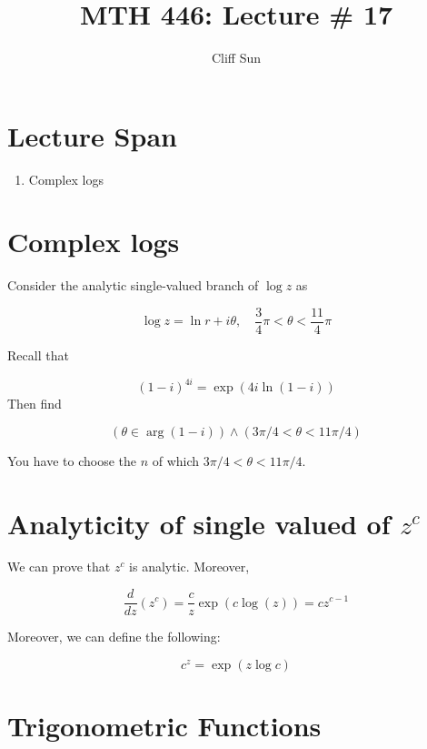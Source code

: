 \documentclass{article}
\title{MTH 446: Lecture \# 17}
\author{Cliff Sun}
\newtheorem{one minute paper}[theorem]{One Minute Paper}
\begin{document}
\maketitle

\section*{Lecture Span}
\begin{enumerate}
    \item Complex logs
\end{enumerate}

\section*{Complex logs}

Consider the analytic single-valued branch of $\log z$ as 

\begin{equation}
    \log z = \ln r + i\theta, \quad \frac{3}{4}\pi < \theta < \frac{11}{4}\pi
\end{equation}

Recall that 

\begin{equation}
    (1-i)^{4i} = \exp(4i\ln(1-i))
\end{equation}
Then find 

\begin{equation}
    \left( \theta \in \arg(1-i) \right) \land (3\pi/4 < \theta < 11\pi/4)
\end{equation}

You have to choose the $n$ of which $3\pi/4 < \theta < 11\pi/4$. 

\section*{Analyticity of single valued of $z^c$}

We can prove that $z^c$ is analytic. Moreover, 

\begin{equation}
    \frac{d}{dz}(z^c) = \frac{c}{z}\exp(c\log(z)) = cz^{c-1}
\end{equation}

Moreover, we can define the following:

\begin{equation}
    c^z = \exp(z\log c)
\end{equation}

\section*{Trigonometric Functions}
\end{document}
